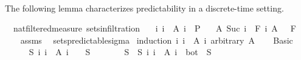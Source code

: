\begin{isabellebody}
\isadelimproof
\ %
\endisadelimproof
%
\isatagproof
\isacommand{{\isachardot}{\kern0pt}{\isachardot}{\kern0pt}}\isamarkupfalse%
%
\endisatagproof
{\isafoldproof}%
%
\isadelimproof
%
\endisadelimproof
%
\begin{isamarkuptext}%
The following lemma characterizes predictability in a discrete-time setting.%
\end{isamarkuptext}\isamarkuptrue%
\isamarkupfalse%
\ {\isacharparenleft}{\kern0pt}\ nat{\isacharunderscore}{\kern0pt}filtered{\isacharunderscore}{\kern0pt}measure{\isacharparenright}{\kern0pt}\ sets{\isacharunderscore}{\kern0pt}in{\isacharunderscore}{\kern0pt}filtration{\isacharcolon}{\kern0pt}\isanewline
\ \ \ {\isachardoublequoteopen}{\isacharparenleft}{\kern0pt}{\isasymUnion}i{\isachardot}{\kern0pt}\ {\isacharbraceleft}{\kern0pt}i{\isacharbraceright}{\kern0pt}\ {\isasymtimes}\ A\ i{\isacharparenright}{\kern0pt}\ {\isasymin}\ {\isasymSigma}\isactrlsub P{\isachardoublequoteclose}\isanewline
\ \ \ {\isachardoublequoteopen}A\ {\isacharparenleft}{\kern0pt}Suc\ i{\isacharparenright}{\kern0pt}\ {\isasymin}\ F\ i{\isachardoublequoteclose}\ {\isachardoublequoteopen}A\ {}\ {\isasymin}\ F\ {}{\isachardoublequoteclose}\isanewline
%
\isadelimproof
\ \ %
\endisadelimproof
%
\isatagproof
{}\isamarkupfalse%
\ assms\ \isamarkupfalse%
\ sets{\isacharunderscore}{\kern0pt}predictable{\isacharunderscore}{\kern0pt}sigma\isanewline
{}\isamarkupfalse%
\ {\isacharparenleft}{\kern0pt}induction\ {\isachardoublequoteopen}{\isacharparenleft}{\kern0pt}{\isasymUnion}i{\isachardot}{\kern0pt}\ {\isacharbraceleft}{\kern0pt}i{\isacharbraceright}{\kern0pt}\ {\isasymtimes}\ A\ i{\isacharparenright}{\kern0pt}{\isachardoublequoteclose}\ arbitrary{\isacharcolon}{\kern0pt}\ A{\isacharparenright}{\kern0pt}\isanewline
\ \ \isamarkupfalse%
\ Basic\isanewline
\ \ \isacommand{{\isacharbraceleft}{\kern0pt}}\isamarkupfalse%
\isanewline
\ \ \ \ \isamarkupfalse%
\ {\isachardoublequoteopen}{\isasymexists}S{\isachardot}{\kern0pt}\ {\isacharparenleft}{\kern0pt}{\isasymUnion}i{\isachardot}{\kern0pt}\ {\isacharbraceleft}{\kern0pt}i{\isacharbraceright}{\kern0pt}\ {\isasymtimes}\ A\ i{\isacharparenright}{\kern0pt}\ {\isacharequal}{\kern0pt}\ {\isacharbraceleft}{\kern0pt}{}{\isacharbraceright}{\kern0pt}\ {\isasymtimes}\ S{\isachardoublequoteclose}\isanewline
\ \ \ \ \isamarkupfalse%
\ \isamarkupfalse%
\ S\ \ S{\isacharcolon}{\kern0pt}\ {\isachardoublequoteopen}{\isacharparenleft}{\kern0pt}{\isasymUnion}i{\isachardot}{\kern0pt}\ {\isacharbraceleft}{\kern0pt}i{\isacharbraceright}{\kern0pt}\ {\isasymtimes}\ A\ i{\isacharparenright}{\kern0pt}\ {\isacharequal}{\kern0pt}\ {\isacharbraceleft}{\kern0pt}bot{\isacharbraceright}{\kern0pt}\ {\isasymtimes}\ S{\isachardoublequoteclose}\ \isamarkupfalse%

\end{isabellebody}
